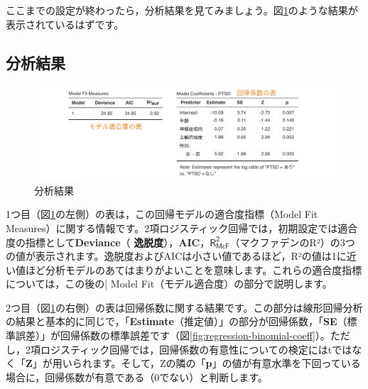 \documentclass[
  12pt,
  a5jpaper,
  lualatex, ja=standard]{bxjsbook}
\renewcommand{\emph}[1]{\textbf{\color{emph} #1}}
\begin{document}
ここまでの設定が終わったら，分析結果を見てみましょう。図\ref{fig:regression-binomial-results}のような結果が表示されているはずです。

\hypertarget{sub:regression-binomial-results}{%
\subsection{分析結果}\label{sub:regression-binomial-results}}

\begin{figure}[!ht]

{\centering \includegraphics[width=1\linewidth]{images/regression/binomial-results} 

}

\caption{分析結果}\label{fig:regression-binomial-results}
\end{figure}

1つ目（図\ref{fig:regression-binomial-results}の左側）の表は，この回帰モデルの適合度指標（Model Fit Measures）に関する情報です。2項ロジスティック回帰では，初期設定では適合度の指標として\textbf{Deviance}（\emph{逸脱度}），\textbf{AIC}，\textbf{\(\textsf{R}^{\textsf{2}}_{\textsf{McF}}\)}（マクファデンのR²）の3つの値が表示されます。逸脱度およびAICは小さい値であるほど，R²の値は1に近い値ほど分析モデルのあてはまりがよいことを意味します。これらの適合度指標については，この後の\colorbox{bar}{\textcolor{gmoji2}{| Model Fit}}（モデル適合度）の部分で説明します。

2つ目（図\ref{fig:regression-binomial-results}の右側）の表は回帰係数に関する結果です。この部分は線形回帰分析の結果と基本的に同じで，「\textbf{Estimate}（推定値）」の部分が回帰係数，「\textbf{SE}（標準誤差）」が回帰係数の標準誤差です（図\ref{fig:regression-binomial-coeff}）。ただし，2項ロジスティック回帰では，回帰係数の有意性についての検定にはtではなく「\textbf{Z}」が用いられます。そして，Zの隣の「\textbf{p}」の値が有意水準を下回っている場合に，回帰係数が有意である（0でない）と判断します。
\end{document}
